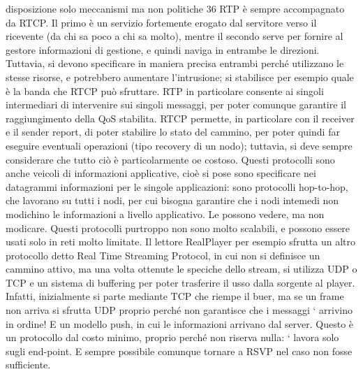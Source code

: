 disposizione solo meccanismi ma non politiche
36
RTP è sempre accompagnato da RTCP. Il primo è un servizio fortemente
erogato dal servitore verso il ricevente (da chi sa poco a chi sa molto), mentre
il secondo serve per fornire al gestore informazioni di gestione, e quindi naviga
in entrambe le direzioni. Tuttavia, si devono specificare in maniera precisa entrambi perché utilizzano le stesse
risorse,
e potrebbero aumentare l'intrusione;
si stabilisce per esempio quale è la banda che RTCP può sfruttare. RTP in
particolare consente ai singoli intermediari di intervenire sui singoli messaggi,
per poter comunque garantire il raggiungimento della QoS stabilita. RTCP permette, in particolare con il receiver e il
sender report, di poter stabilire lo stato
del cammino, per poter quindi far eseguire eventuali operazioni (tipo recovery
di un nodo); tuttavia, si deve sempre considerare che tutto ciò è particolarmente
oe
costoso.
Questi protocolli sono anche veicoli di informazioni applicative, cioè si pose
sono specificare nei datagrammi informazioni per le singole applicazioni: sono
protocolli hop-to-hop, che lavorano su tutti i nodi, per cui bisogna garantire che
i nodi intemedi non modichino le informazioni a livello applicativo. Le possono
vedere, ma non modicare.
Questi protocolli purtroppo non sono molto scalabili, e possono essere usati
solo in reti molto limitate. Il lettore RealPlayer per esempio sfrutta un altro
protocollo detto Real Time Streaming Protocol, in cui non si definisce un cammino attivo, ma una volta ottenute le
speciche dello stream, si utilizza UDP
o TCP e un sistema di buffering per poter trasferire il usso dalla sorgente al
player. Infatti, inizialmente si parte mediante TCP che riempe il buer, ma se
un frame non arriva si sfrutta UDP proprio perché non garantisce che i messaggi
`
arrivino in ordine! E un modello push, in cui le informazioni arrivano dal server. Questo è un protocollo dal costo
minimo, proprio perché non riserva nulla:
`
lavora solo sugli end-point. E sempre possibile comunque tornare a RSVP nel
caso non fosse sufficiente.

